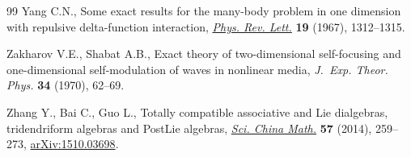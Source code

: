 \documentclass[pdftex]{sigma}
\numberwithin{equation}{section}
\theoremstyle{definition}
\begin{document}
\begin{thebibliography}{99}
Yang C.N., Some exact results for the many-body problem in one dimension with
 repulsive delta-function interaction,
 \href{https://doi.org/10.1103/PhysRevLett.19.1312}{\textit{Phys. Rev. Lett.}}
 \textbf{19} (1967), 1312--1315.

Zakharov V.E., Shabat A.B., Exact theory of two-dimensional self-focusing and
 one-dimensional self-modulation of waves in nonlinear media, \textit{J.~Exp.
 Theor. Phys.} \textbf{34} (1970), 62--69.

Zhang Y., Bai C., Guo L., Totally compatible associative and {L}ie dialgebras,
 tridendriform algebras and {P}ost{L}ie algebras,
 \href{https://doi.org/10.1007/s11425-013-4756-0}{\textit{Sci. China Math.}}
 \textbf{57} (2014), 259--273,
 \href{http://arxiv.org/abs/1510.03698}{arXiv:1510.03698}.

\end{thebibliography}\LastPageEnding
\end{document}
